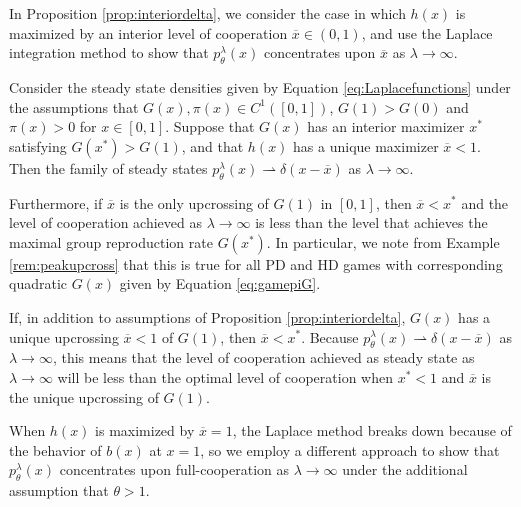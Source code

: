 \documentclass[11pt]{article}
\numberwithin{equation}{section}
\newcommand{\ol}{\overline}
\begin{document}
{In Proposition \ref{prop:interiordelta}, we consider the case in which $h(x)$ is maximized by an interior level of cooperation $\overline{x} \in (0,1)$, and use the Laplace integration method \cite{bender1999advanced} to show that $p^{\lambda}_{\theta}(x)$ concentrates upon $\overline{x}$ as $\lambda \to \infty$. 
 
 \begin{proposition} \label{prop:interiordelta} 
Consider the steady state densities given by Equation \eqref{eq:Laplacefunctions} under the assumptions that $G(x), \pi(x) \in C^1\left([0,1]\right)$, $G(1) > G(0)$ and $\pi(x) > 0$ for $x \in [0,1]$. Suppose that $G(x)$ has an interior maximizer $x^*$ satisfying $G(x^*) > G(1)$, and that $h(x)$ has a unique maximizer $\overline{x} < 1$. Then the family of steady states $p^{\lambda}_{\theta}(x) \rightharpoonup \delta(x - \overline{x})$ as $\lambda \to \infty$. 
\end{proposition}

Furthermore, if $\overline{x}$ is the only upcrossing of $G(1)$ in $[0,1]$, then $ \overline{x} < x^*$ and the level of cooperation achieved as $\lambda \to \infty$ is less than the level that achieves the maximal group reproduction rate $G(x^*)$. In particular, we note from Example \ref{rem:peakupcross} that this is true for all PD and HD games with corresponding quadratic $G(x)$ given by Equation \eqref{eq:gamepiG}.

\begin{remark}
If, in addition to assumptions of Proposition \ref{prop:interiordelta}, $G(x)$ has a unique upcrossing $\overline{x} < 1$ of $G(1)$, then $\overline{x} < x^*$. Because $p^{\lambda}_{\theta}(x) \rightharpoonup \delta(x-\overline{x})$ as $\lambda \to \infty$, this means that the level of cooperation achieved as steady state as $\lambda \to \infty$ will be less than the optimal level of cooperation when $x^* < 1$ and $\overline{x}$ is the unique upcrossing of $G(1)$. 
\end{remark}

When $h(x)$ is maximized by $\ol{x} = 1$, the Laplace method breaks down because of the behavior of $b(x)$ at $x = 1$, so we employ a different approach to show that $p^{\lambda}_{\theta}(x)$ concentrates upon full-cooperation as $\lambda \to \infty$ under the additional assumption that $\theta > 1$. 

}
\end{document}
